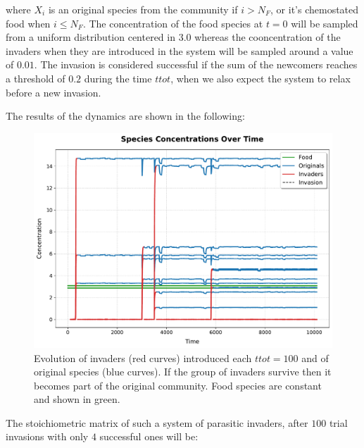 \documentclass{article}
\begin{document}
where $X_i$ is an original species from the community if $i>N_F$, or it's chemostated food when $i \le N_F$. The concentration of the food species at $t=0$ will be sampled from a uniform distribution centered in $3.0$ whereas the cooncentration of the invaders when they are introduced in the system will be sampled around a value of $0.01$. The invasion is considered successful if the sum of the newcomers reaches a threshold of $0.2$ during the time $ttot$, when we also expect the system to relax before a new invasion.

The results of the dynamics are shown in the following:

\begin{figure}[H]
    \centering
    \includegraphics[width=0.6\linewidth]{Successive_species_concentrations_2.pdf} 
    \caption{\small{Evolution of invaders (red curves) introduced each $ttot=100$ and of original species (blue curves). If the group of invaders survive then it becomes part of the original community. Food species are constant and shown in green.}}
    \label{Fig. 11}
\end{figure}

The stoichiometric matrix of such a system of parasitic invaders, after $100$ trial invasions with only $4$ successful ones will be:

\newenvironment{mpmatrix}{\begin{medsize}\begin{pmatrix}}%
    {\end{pmatrix}\end{medsize}}%
\end{document}
